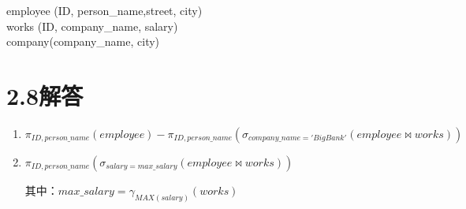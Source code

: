 \documentclass{article}
\begin{document}
	\begin{tcolorbox}[title = {2-17的职员数据库}, colback = blue!25!white, colframe = blue!75!black]
		employee (ID, person\_name,street, city)\\
		works (ID, company\_name, salary) \\
		company(company\_name, city)
	\end{tcolorbox}
	
	\section*{2.8解答}
	
	\begin{enumerate}[noitemsep, label={{\arabic*})}]
		\item $\pi_{ID, person\_name} (employee) - \pi_{ID, person\_name} (\sigma_{company\_name = 'BigBank'} (employee \bowtie works))$
		
		\item $\pi_{ID, person\_name} ( \sigma_{salary = max\_salary} (employee \bowtie works) )$ 
		
		其中：$max\_salary = \gamma_{MAX(salary)} (works)$
		
	\end{enumerate}\textbf{}
	
\end{document}
